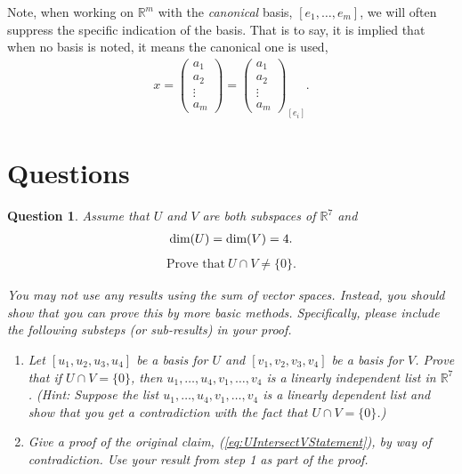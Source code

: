 \documentclass[12pt]{article}
\newtheorem{question}[thm]{Question}
\def\real{{\mathbb R}}
\def\dim{\textnormal{dim}}
\newcommand{\ColVecFour}[4]{\begin{pmatrix} #1\\ #2\\#3 \\ #4\end{pmatrix}}
\newcommand{\intersect}{\cap}
\begin{document}
Note, when working on $\real^m$ with the \emph{canonical} basis, $[e_1,\dots, e_m]$, we will often suppress the specific indication of the basis.  That is to say, it is implied that when no basis is noted, it means the canonical one is used, 
\begin{align*}
	x=\ColVecFour{a_1}{a_2}{\vdots}{a_m} = \ColVecFour{a_1}{a_2}{\vdots}{a_m}_{[e_i]}.
\end{align*}





\section{Questions}


\begin{question}
	\normalfont
	
	Assume that $U$ and $V$ are both subspaces of $\real^7$ and 
	\begin{align*}
		\dim(U)=\dim(V)=4.
	\end{align*} 
	\begin{align}\label{eq:UIntersectVStatement}
		\text{Prove that}\  U\intersect V \not= \{0\}. 
	\end{align}
	 
	
	
	
	You may not use any results using the sum of vector spaces.  Instead, you should show that you can prove this by more basic methods.  Specifically, please include the following substeps (or sub-results) in your proof.
	
	\begin{enumerate}
		\item Let $[u_1, u_2, u_3, u_4]$ be a basis for $U$ and $[v_1, v_2, v_3, v_4]$ be a basis for $V$.  Prove that if $U\intersect V = \{0\}$, then \hspace{.1cm} $u_1,\dots, u_4, v_1,\dots, v_4$ \hspace{.1cm} is a linearly independent list in $\real^7$.   (Hint: Suppose the list $u_1, \dots, u_4, v_1,\dots, v_4$ is a linearly dependent list and show that you get a contradiction with the fact that $U\intersect V = \{0\}$.)
		
		\item Give a proof of the original claim, (\ref{eq:UIntersectVStatement}), by way of contradiction.  Use your result from step 1 as part of the proof. 
	\end{enumerate}
\end{question}
\end{document}
